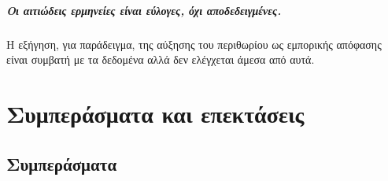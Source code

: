 \documentclass[12pt,a4paper,oneside]{report}
\renewcommand{\_}{\oldunderscore\allowbreak}
\theoremstyle{definition}
\theoremstyle{plain}
\theoremstyle{remark}
\begin{document}
\paragraph{Οι αιτιώδεις ερμηνείες είναι εύλογες, όχι αποδεδειγμένες.} Η εξήγηση, για
παράδειγμα, της αύξησης του περιθωρίου ως εμπορικής απόφασης είναι συμβατή με τα δεδομένα
αλλά δεν ελέγχεται άμεσα από αυτά.

\chapter{Συμπεράσματα και επεκτάσεις}
\label{ch:conclusion}

\section{Συμπεράσματα}
\end{document}
